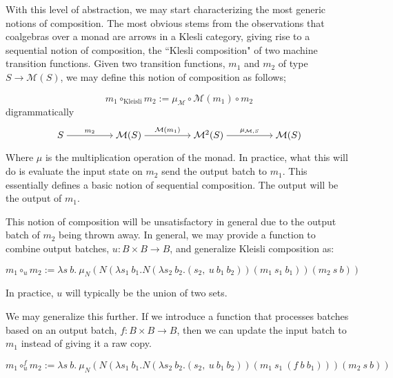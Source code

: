 With this level of abstraction, we may start characterizing the most generic notions of composition. The most obvious stems from the observations that coalgebras over a monad are arrows in a Klesli category, giving rise to a sequential notion of composition, the ``Klesli composition" of two machine transition functions. Given two transition functions, $m_1$ and $m_2$
of type $S \to \mathcal{M}(S)$, we may define this notion of composition as follows;

\begin{equation}
    m_1 \circ_{\text{Kleisli}} m_2 := \mu_{\mathcal{M}} \circ \mathcal{M}(m_1) \circ m_2
\end{equation}
digrammatically
\[\begin{tikzcd}[cramped]
	S && {\mathcal{M}(S)} && {\mathcal{M}^2(S)} && {\mathcal{M}(S)}
	\arrow["{m_2}", from=1-1, to=1-3]
	\arrow["{\mathcal{M}(m_1)}", from=1-3, to=1-5]
	\arrow["{\mu_{\mathcal{M}, S}}", from=1-5, to=1-7]
\end{tikzcd}\]

Where $\mu$ is the multiplication operation of the monad. In practice, what this will do is evaluate the input state on $m_2$ send the output batch to $m_1$. This essentially defines a basic notion of sequential composition. The output will be the output of $m_1$.

This notion of composition will be unsatisfactory in general due to the output batch of $m_2$ being thrown away. In general, we may provide a function to combine output batches, $u : B \times B \rightarrow B$, and generalize Kleisli composition as:

\begin{equation}\label{eq:Klesli-composition}
    m_1 \circ_{u} m_2 := \lambda s\ b.\ \mu_{N}(N(\lambda s_1\ b_1. N(\lambda s_2\ b_2. (s_2,\ u\ b_1\ b_2)) (m_1\ s_1\ b_1)) (m_2\ s\ b))
\end{equation}

In practice, $u$ will typically be the union of two sets.

We may generalize this further. If we introduce a function that processes batches based on an output batch, $f : B \times B \rightarrow B$, then we can update the input batch to $m_1$ instead of giving it a raw copy.

\begin{equation}\label{eq:Klesli-composition-f}
    m_1 \circ^{f}_{u} m_2 := \lambda s\ b.\ \mu_{N}(N(\lambda s_1\ b_1. N(\lambda s_2\ b_2. (s_2,\ u\ b_1\ b_2)) (m_1\ s_1\ (f\ b\ b_1))) (m_2\ s\ b))
\end{equation}


